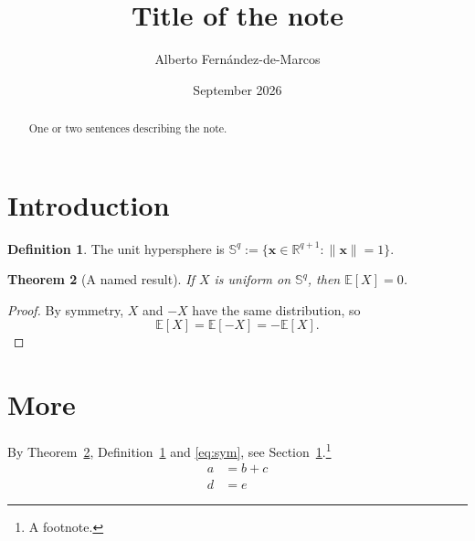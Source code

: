 \documentclass[11pt]{article}
\title{Title of the note}
\author{Alberto Fernández-de-Marcos}
\date{September 2026}
\newtheorem{theorem}{Theorem}
\theoremstyle{definition}
\newtheorem{definition}[theorem]{Definition}
\theoremstyle{remark}
\newcommand{\E}{\mathbb{E}}
\newcommand{\R}{\mathbb{R}}
\begin{document}
\maketitle

\begin{abstract}
One or two sentences describing the note.
\end{abstract}

\tableofcontents

\section{Introduction}\label{sec:intro}

\begin{definition}\label{def:sphere}
The unit hypersphere is $\mathbb{S}^q := \{\mathbf{x}\in\R^{q+1} : \|\mathbf{x}\| = 1\}$.
\end{definition}

\begin{theorem}[A named result]\label{thm:main}
If $X$ is uniform on $\mathbb{S}^q$, then $\E[X] = 0$.
\end{theorem}

\begin{proof}
By symmetry, $X$ and $-X$ have the same distribution, so
\begin{equation}\label{eq:sym}
  \E[X] = \E[-X] = -\E[X].
\end{equation}
\end{proof}

\section{More}

By Theorem~\ref{thm:main}, Definition~\ref{def:sphere} and \eqref{eq:sym}, see Section~\ref{sec:intro}.\footnote{A footnote.}
\begin{align}
  a &= b + c \label{eq:a}\\
  d &= e
\end{align}
\end{document}
